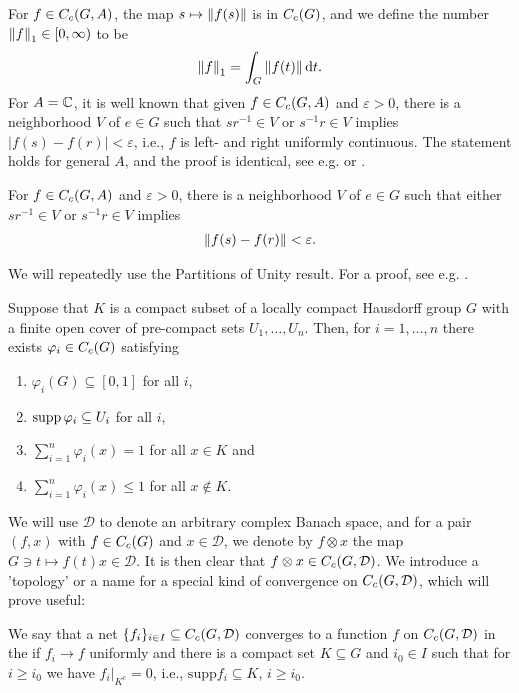 For $f \in C_c(G,A)$, the map $s \mapsto \left\lVert f(s) \right\rVert$ is in $C_c(G)$, and we define the number $\left\lVert f \right\rVert_1 \in [0,\infty)$ to be
\begin{align*}
\left\lVert f \right\rVert_1 = \int_G \left\lVert f(t) \right\rVert \mathrm{d} t.
\end{align*}
For $A= \mathbb{C}$, it is well known that given $f \in C_c(G,A)$ and $\varepsilon > 0$, there is a neighborhood $V$ of $e \in G$ such that $sr^{-1} \in V$ or $s^{-1}r \in V$ implies $| f(s) - f(r)| < \varepsilon$, i.e., $f$ is left- and right uniformly continuous. The statement holds for general $A$, and the proof is identical, see e.g. \cite[Proposition 2.6]{folland2016fourier} or \cite[Lemma 1.88]{williamscrossed}.
\begin{lemma}
For $f \in C_c(G,A)$ and $\varepsilon>0$, there is a neighborhood $V$ of $e \in G$ such that either $sr^{-1} \in V$ or $s^{-1}r \in V$ implies
\begin{align*}
	\left\lVert f(s)  - f(r) \right\rVert < \varepsilon.
\end{align*}
\label{int:lrunicont}
\end{lemma}
We will repeatedly use the Partitions of Unity result. For a proof, see e.g. \cite[Lemma 1.43]{williamscrossed}.
\begin{lemma}
	Suppose that $K$ is a compact subset of a locally compact Hausdorff group $G$ with a finite open cover of pre-compact sets $U_1,\dots,U_n$. Then, for $i=1,\dots,n$ there exists $\varphi_i \in C_c(G)$ satisfying
	\begin{enumerate}[nosep]
		\item $\varphi_i(G) \subseteq [0,1]$ for all $i$,
		\item $\operatorname{supp} \varphi_i \subseteq U_i$ for all $i$,
		\item $\sum_{i=1}^n \varphi_i(x) = 1$ for all $x \in K$ and
		\item $\sum_{i = 1 }^n \varphi_i(x) \leq 1$ for all $x \not \in K$.
	\end{enumerate}
\end{lemma}

We will use $\mathcal{D}$ to denote an arbitrary complex Banach space, and for a pair $(f,x)$ with $f \in C_c(G)$ and $x \in \mathcal{D}$, we denote by $f \otimes x$ the map $G \ni t \mapsto f(t)x \in \mathcal{D}$. It is then clear that $f \otimes x \in C_c(G,\mathcal{D})$. We introduce a 'topology' or a name for a special kind of convergence on $C_c(G,\mathcal{D})$, which will prove useful:
\begin{definition}
We say that a net $\{f_i\}_{i \in I} \subseteq C_c(G,\mathcal{D})$ converges to a function $f$ on $C_c(G,\mathcal{D})$ in the  if $f_i \to f$ uniformly and there is a compact set $K \subseteq G$ and $i_0 \in I$ such that for $i \geq i_0$ we have $f_i \big|_{K^c} = 0$, i.e., $\mathrm{supp} f_i \subseteq K$, $i \geq i_0$.
\end{definition}

